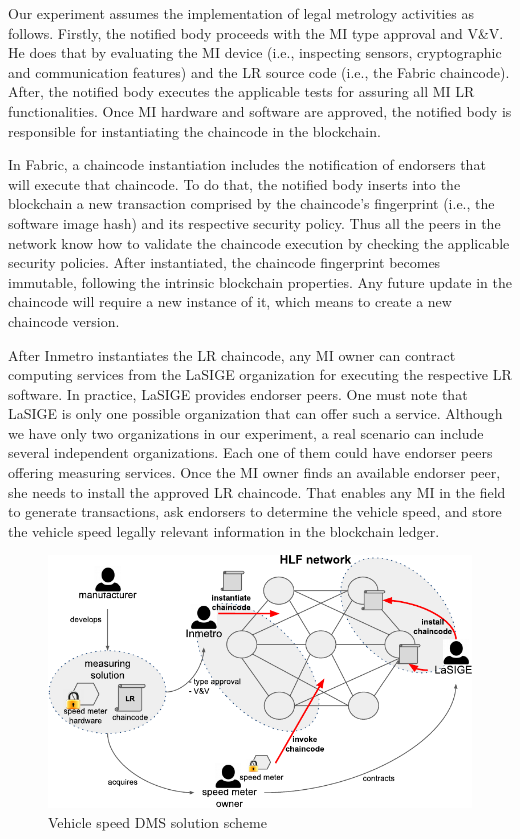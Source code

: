 \documentclass[journal]{IEEEtran}
\begin{document}
Our experiment assumes the implementation of legal metrology activities as follows.
Firstly, the notified body proceeds with the MI type approval and V\&V.
He does that by evaluating the MI device (i.e., inspecting sensors, cryptographic and communication features) and the LR source code (i.e., the Fabric chaincode).
After,  the notified body executes the applicable tests for assuring all MI LR functionalities.
Once MI hardware and software are approved, the notified body is responsible for instantiating the chaincode in the blockchain.

In Fabric, a chaincode instantiation includes the notification of endorsers that will execute that chaincode.
To do that, the notified body inserts into the blockchain a new transaction comprised by the chaincode's fingerprint (i.e., the software image hash) and its respective security policy.
Thus all the peers in the network know how to validate the chaincode execution by checking the applicable security policies.
After instantiated, the chaincode fingerprint becomes immutable, following the intrinsic blockchain properties.
Any future update in the chaincode will require a new instance of it, which means to create a new chaincode version.

After Inmetro instantiates the LR chaincode, any MI owner can contract computing services from the LaSIGE organization for executing the respective LR software.
In practice, LaSIGE provides endorser peers.
One must note that LaSIGE is only one possible organization that can offer such a service.
Although we have only two organizations in our experiment, a real scenario can include several independent organizations.
Each one of them could have endorser peers offering measuring services.
Once the MI owner finds an available endorser peer, she needs to install the approved LR chaincode.
That enables any MI in the field to generate transactions, ask endorsers to determine the vehicle speed, and store the vehicle speed legally relevant information in the blockchain ledger.

\begin{figure}[!t]
\centering
\includegraphics[width=.45\textwidth]{hlfscheme} %
\caption{Vehicle speed DMS solution scheme}
\label{f:scheme}
\end{figure}
\end{document}
